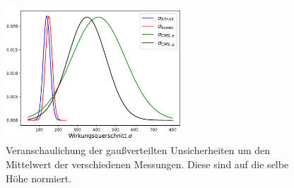 \begin{figure}
  \centering
  \includegraphics[width=0.6\textwidth]{Plots/gauss.pdf}
  \caption{Veranschaulichung der gaußverteilten Unsicherheiten um den Mittelwert der verschiedenen Messungen. Diese sind auf die selbe Höhe normiert.}
  \label{fig:gau}
\end{figure}

